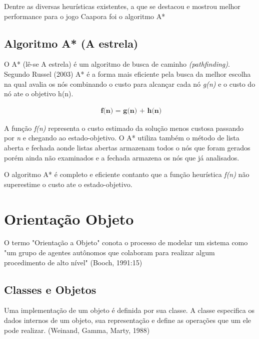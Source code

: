 Dentre as diversas heurísticas existentes, a que se destacou e mostrou melhor performance para o jogo Caapora foi o algoritmo A*
	

\subsection{Algoritmo A* (A estrela)}	
O A* (lê-se A estrela) é um algoritmo de busca de caminho \textit{(pathfinding)}. Segundo Russel (2003) A* é a forma mais eficiente pela busca da melhor escolha na qual avalia os nós combinando o custo para alcançar cada nó \textit{g(n)} e o custo do nó ate o objetivo h(n).

	\begin{equation}
		\begin{aligned}
		\textbf{ f(n) = g(n) + h(n)} 
		\end{aligned}
	\end{equation}
 
A função \textit{f(n)} representa o custo estimado da solução menos custosa passando por \textit{n} e chegando ao estado-objetivo. O A* utiliza também o método de lista aberta e fechada aonde listas abertas armazenam todos o nós que foram gerados porém ainda não examinados e a fechada armazena os nós que já analisados.

O algoritmo A* é completo e eficiente contanto que a função heurística \textit{f(n)} não superestime o custo ate o estado-objetivo.
\cite{aestar}

\section{Orientação Objeto}
\label{sec:orientação-objeto}	

O termo "Orientação a Objeto" conota o processo de modelar um sistema como "um grupo de agentes autônomos que colaboram para realizar algum procedimento de alto nível" (Booch, 1991:15)


\subsection{Classes e Objetos}	

Uma implementação de um objeto é definida por sua classe. A classe especifica os dados internos de um objeto, sua representação e define as operações que um ele pode realizar.
(Weinand, Gamma, Marty, 1988)


